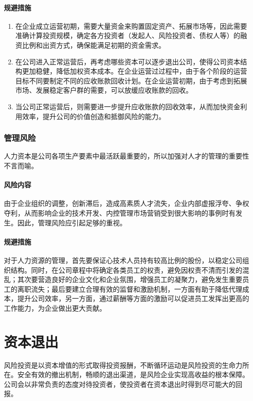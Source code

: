 \documentclass[violet]{main}
\begin{document}
					\paragraph{规避措施}
						\begin{enumerate}
								\item 在企业成立运营初期，需要大量资金来购置固定资产、拓展市场等，因此需要准确计算投资规模，确定各方投资者（发起人、风险投资者、债权人等）的融资比例和出资方式，确保能满足初期的资金需求。
								\item 在公司进入正常运营后，再考虑哪些资本可以逐步退出公司，使得公司资本结构更加稳健，降低加权资本成本。在企业运营过过程中，由于各个阶段的运营目标不同要制定不同的应收账款回收计划。在企业运营初期，由于考虑到拓展市场、发展稳定客户群的需要，可以放缓应收账款的回收。
								\item 当公司正常运营后，则需要进一步提升应收账款的回收效率，从而加快资金利用效率，提升公司的价值创造和抵御风险的能力。
						\end{enumerate}
				\subsubsection{管理风险}
					人力资本是公司各项生产要素中最活跃最重要的，所以加强对人才的管理的重要性不言而喻。
					\paragraph{风险内容}
						由于企业组织的调整，创新滞后，造成高素质人才流失，企业内部虚报浮夸、争权夺利，从而影响企业的技术开发、内控管理市场营销受到很大影响的事例时有发生。因此，管理风险应引起足够的重视。
					\paragraph{规避措施}
						对于人力资源的管理，首先要保证心技术人员持有较高比例的股份，以稳定公司组织结构。同时，在公司章程中将确定各类员工的权责，避免因权责不清而引发的混乱；其次要营造良好的企业文化和企业氛围，增强员工的凝聚力，避免发生重要员工的离职流失；最后要建立合理有效的监督和激励机制，一方面有助于降低代理成本，提升公司效率，另一方面，通过薪酬等方面的激励可以促进员工发挥出更高的工作能力，为企业做出更大贡献。
		\section{资本退出}
			风险投资是以资本增值的形式取得投资报酬，不断循环运动是风险投资的生命力所在。安全有效的撤出机制，畅顺的退出渠道，是风险企业实现高收益的根本保障。公司会以非常负责的态度对待投资者，使投资者在资本退出时得到尽可能大的回报。
\end{document}
